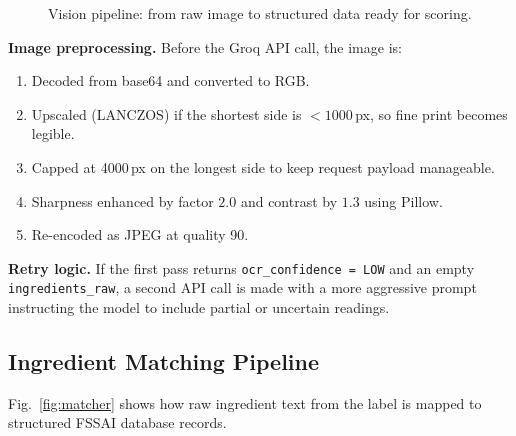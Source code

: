 \documentclass[conference]{IEEEtran}
\begin{document}
\begin{figure}[ht]
\caption{Vision pipeline: from raw image to structured data ready for scoring.}
\label{fig:vision}
\end{figure}

\noindent\textbf{Image preprocessing.} Before the Groq API call, the image is:
\begin{enumerate}
  \item Decoded from base64 and converted to RGB.
  \item Upscaled (LANCZOS) if the shortest side is $<\!1000$\,px, so fine print becomes legible.
  \item Capped at 4000\,px on the longest side to keep request payload manageable.
  \item Sharpness enhanced by factor $2.0$ and contrast by $1.3$ using Pillow.
  \item Re-encoded as JPEG at quality 90.
\end{enumerate}

\noindent\textbf{Retry logic.} If the first pass returns \texttt{ocr\_confidence = LOW}
and an empty \texttt{ingredients\_raw}, a second API call is made with a more
aggressive prompt instructing the model to include partial or uncertain readings.

\subsection{Ingredient Matching Pipeline}

Fig.~\ref{fig:matcher} shows how raw ingredient text from the label is mapped to
structured FSSAI database records.
\end{document}
